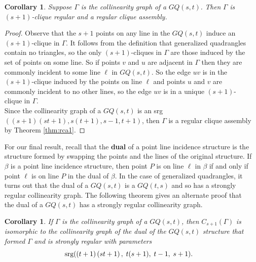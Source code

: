 \documentclass[12pt]{report}
\newtheorem{cor}[thm]{Corollary}
\theoremstyle{definition}
\begin{document}
\begin{cor} \label{thm:gq}
    Suppose $\Gamma$ is the collinearity graph of a $GQ(s,t)$. Then $\Gamma$ is $(s+1)$-clique regular and a regular clique assembly.
\end{cor}
\begin{proof}
     Observe that the $s+1$ points on any line in the $GQ(s,t)$ induce an $(s+1)$-clique in $\Gamma$. It follows from the definition that generalized quadrangles contain no triangles, so the only $(s+1)$-cliques in $\Gamma$ are those induced by the set of points on some line. So if points $v$ and $u$ are adjacent in $\Gamma$ then they are commonly incident to some line $\ell$ in $GQ(s,t)$. So the edge $uv$ is in the $(s+1)$-clique induced by the points on line $\ell$ and points $u$ and $v$ are commonly incident to no other lines, so the edge $uv$ is in a unique $(s+1)$-clique in $\Gamma$.\\
    Since the collinearity graph of a $GQ(s,t)$ is an srg$((s+1)(st+1), s(t+1), s-1, t+1)$, then $\Gamma$ is a regular clique assembly by Theorem \ref{thm:rca1}.
\end{proof}
For our final result, recall that the \textbf{dual} of a point line incidence structure is the structure formed by swapping the points and the lines of the original structure. If $\beta$ is a point line incidence structure, then point $P$ is on line $\ell$ in $\beta$ if and only if point $\ell$ is on line $P$ in the dual of $\beta$. In the case of generalized quadrangles, it turns out that the dual of a $GQ(s,t)$ is a $GQ(t,s)$ and so has a strongly regular collinearity graph. The following theorem gives an alternate proof that the dual of a $GQ(s,t)$ has a strongly regular collinearity graph.
\clearpage
\begin{cor} \label{thm:gq1}
    If $\Gamma$ is the collinearity graph of a $GQ(s,t)$, then $C_{s+1}(\Gamma)$ is isomorphic to the collinearity graph of the dual of the $GQ(s,t)$ structure that formed $\Gamma$ and is strongly regular with parameters 
    \[\textnormal{srg}(\left(t+1\right)\left(st+1\right), \; t(s+1),\; t-1, \;s+1).\]
\end{cor}
\end{document}
